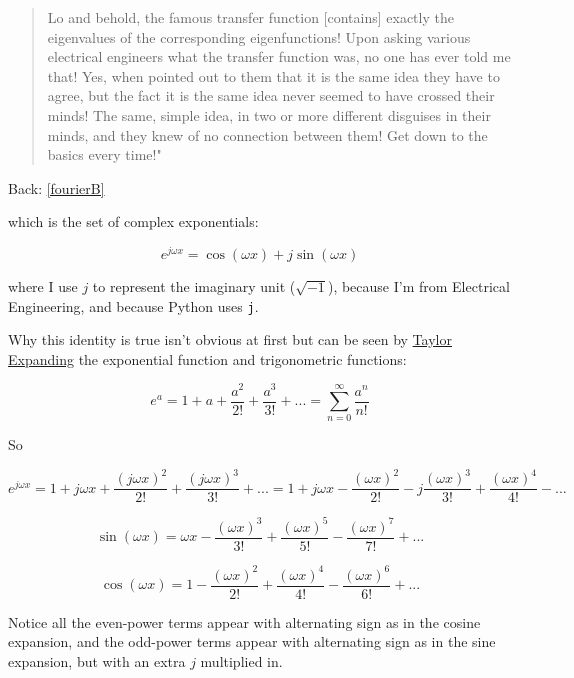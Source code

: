 \documentclass[10pt]{article}
\begin{document}
{\begin{quotation}
Lo and behold, the famous transfer function [contains] exactly the eigenvalues of the corresponding eigenfunctions! Upon asking various electrical engineers what the transfer function was, no one has ever told me that! Yes, when pointed out to them that it is the same idea they have to agree, but the fact it is the same idea never seemed to have crossed their minds! The same, simple idea, in two or more different disguises in their minds, and they knew of no connection between them! Get down to the basics every time!"\end{quotation}

Back: \autoref{fourierB}} which is the set of complex exponentials:\vspace{-2mm}

\begin{equation}\label{euler}
e^{j \omega x} = \cos(\omega x) + j \sin(\omega x)
\end{equation}

\noindent where I use $j$ to represent the imaginary unit ($\sqrt{-1}$), because I'm from Electrical Engineering, and because Python uses \texttt{j}.

Why this identity is true isn't obvious at first but can be seen by \href{https://math.stackexchange.com/a/492165/278341}{Taylor Expanding}\cite{taylor} the exponential function and trigonometric functions:

$$e^a = 1 + a + \frac{a^2}{2!} + \frac{a^3}{3!} + ... = \sum_{n=0}^{\infty} \frac{a^n}{n!}$$

\noindent So\vspace{-2mm}

$$e^{j \omega x} = 1 + j \omega x + \frac{(j \omega x)^2}{2!} + \frac{(j \omega x)^3}{3!} + ... = 1 + j \omega x - \frac{(\omega x)^2}{2!} - j \frac{(\omega x)^3}{3!} + \frac{(\omega x)^4}{4!} - ...$$

$$\sin(\omega x) = \omega x - \frac{(\omega x)^3}{3!} + \frac{(\omega x)^5}{5!} - \frac{(\omega x)^7}{7!} + ...$$

$$\cos(\omega x) = 1 - \frac{(\omega x)^2}{2!} + \frac{(\omega x)^4}{4!} - \frac{(\omega x)^6}{6!} + ...$$\vspace{0mm}

\noindent Notice all the even-power terms appear with alternating sign as in the cosine expansion, and the odd-power terms appear with alternating sign as in the sine expansion, but with an extra $j$ multiplied in.
\end{document}
